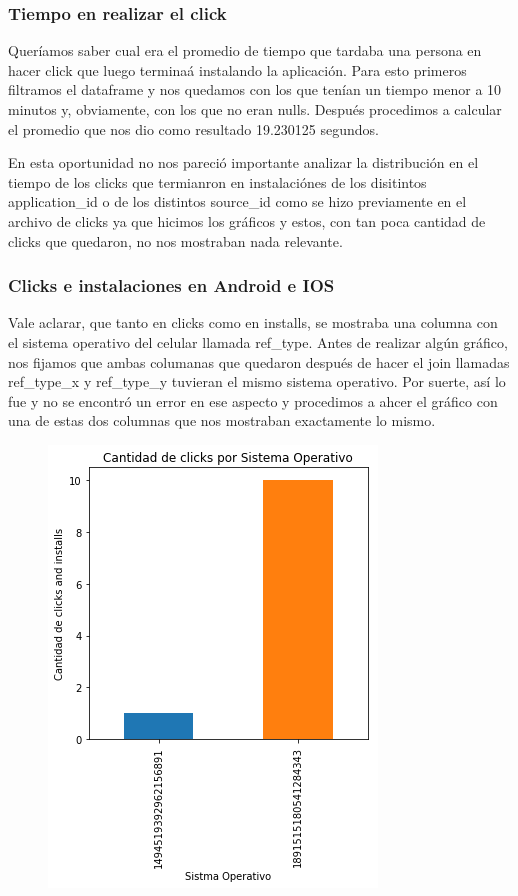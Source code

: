 \documentclass[a4paper, 12pt]{article}
\newcommand\tab[1][1cm]{\hspace*{#1}}
\begin{document}
{{	
	\subsubsection{Tiempo en realizar el click}
	\tab Queríamos saber cual era el promedio de tiempo que tardaba una persona en hacer click que luego terminaá instalando la aplicación. Para esto primeros filtramos el dataframe y nos quedamos con los que tenían un tiempo menor a 10 minutos y, obviamente, con los que no eran nulls. Después procedimos a calcular el promedio que nos dio como resultado 19.230125 segundos.
	
	\tab En esta oportunidad no nos pareció importante analizar la distribución en el tiempo de los clicks que termianron en instalaciónes de los disitintos application\_id o de los distintos source\_id como se hizo previamente en el archivo de clicks ya que hicimos los gráficos y estos, con tan poca cantidad de clicks que quedaron, no nos mostraban nada relevante.
	
	\clearpage
	\subsubsection{Clicks e instalaciones en Android e IOS}
	\tab Vale aclarar, que tanto en clicks como en installs, se mostraba una columna con el sistema operativo del celular llamada ref\_type. Antes de realizar algún gráfico, nos fijamos que ambas columanas que quedaron después de hacer el join llamadas ref\_type\_x y ref\_type\_y tuvieran el mismo sistema operativo. Por suerte, así lo fue y no se encontró un error en ese aspecto y procedimos a ahcer el gráfico con una de estas dos columnas que nos mostraban exactamente lo mismo.
	
	\FloatBarrier
		\begin{figure}[h]
			\centering
			\includegraphics[scale = 0.7]{images/clicks-installs/ref_type.png}
			\caption{}
		\end{figure}
	\FloatBarrier

}}
\end{document}
